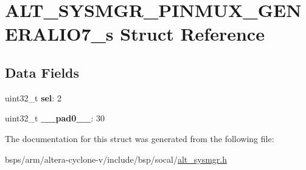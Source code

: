 \hypertarget{structALT__SYSMGR__PINMUX__GENERALIO7__s}{}\section{A\+L\+T\+\_\+\+S\+Y\+S\+M\+G\+R\+\_\+\+P\+I\+N\+M\+U\+X\+\_\+\+G\+E\+N\+E\+R\+A\+L\+I\+O7\+\_\+s Struct Reference}
\label{structALT__SYSMGR__PINMUX__GENERALIO7__s}
\subsection*{Data Fields}
\begin{DoxyCompactItemize}
\item 
\mbox{\label{structALT__SYSMGR__PINMUX__GENERALIO7__s_a3e1a273e9e33c4d69de2816c2bfd56d7}} 
uint32\+\_\+t {\bfseries sel}\+: 2
\item 
\mbox{\label{structALT__SYSMGR__PINMUX__GENERALIO7__s_a568b2ffc9834032e427f07d87af03414}} 
uint32\+\_\+t {\bfseries \+\_\+\+\_\+pad0\+\_\+\+\_\+}\+: 30
\end{DoxyCompactItemize}


The documentation for this struct was generated from the following file\+:\begin{DoxyCompactItemize}
\item 
bsps/arm/altera-\/cyclone-\/v/include/bsp/socal/\mbox{\hyperlink{alt__sysmgr_8h}{alt\+\_\+sysmgr.\+h}}\end{DoxyCompactItemize}
